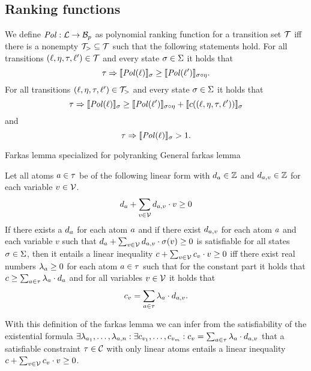 \subsection{Ranking functions}

\begin{definition} 
	We define $\mathit{Pol}: \mathcal{L} \rightarrow \mathcal{B}_p$ as polynomial ranking function for a transition set $\mathcal{T}$ iff there is a nonempty $\mathcal{T}_{>} \subseteq \mathcal{T}$ such that the following statements hold.
        For all transitions $(\ell, \eta, \tau, \ell') \in \mathcal{T}$ and every state $\sigma \in \Sigma$ it holds that
	\[ \tau \Rightarrow \llbracket \mathit{Pol}(\ell) \rrbracket_{\sigma} \geq \llbracket \mathit{Pol}(\ell') \rrbracket_{\sigma \circ \eta}. \]
        For all transitions $(\ell, \eta, \tau, \ell') \in \mathcal{T}_{>}$ and every state $\sigma \in \Sigma$ it holds that        
	\[ \tau \Rightarrow \llbracket \mathit{Pol}(\ell) \rrbracket_{\sigma} \geq \llbracket \mathit{Pol}(\ell') \rrbracket_{\sigma \circ \eta} + \llbracket c((\ell, \eta, \tau, \ell')) \rrbracket_{\sigma} \]
        and
	\[ \tau \Rightarrow \llbracket \mathit{Pol}(\ell) \rrbracket_{\sigma} > 1. \]
\end{definition}





Farkas lemma specialized for polyranking \cite{bradley2005polyranking}
General farkas lemma \cite{schrijver1998theory}
\begin{definition}
  Let all atoms $a \in \tau$ be of the following linear form with $d_a \in \mathbb{Z}$ and $d_{a,v} \in \mathbb{Z}$ for each variable $v \in \mathcal{V}$.
  \[ d_a + \sum_{v \in \mathcal{V}} d_{a,v} \cdot v \geq 0 \]
  If there exists a $d_a$ for each atom $a$ and if there exist $d_{a,v}$ for each atom $a$ and each variable $v$ such that $d_a + \sum_{v \in \mathcal{V}} d_{a,v} \cdot \sigma(v) \geq 0$ is satisfiable for all states $\sigma \in \Sigma$, then it entails a linear inequality $c + \sum_{v \in \mathcal{V}} c_v \cdot v \geq 0$ iff there exist real numbers $\lambda_a \geq 0$ for each atom $a \in \tau$ such that for the constant part it holds that $c \geq \sum_{a \in \tau} \lambda_a \cdot d_a$ and for all variables $v \in \mathcal{V}$ it holds that
  \[ c_v = \sum_{a \in \tau} \lambda_a \cdot d_{a,v}. \]
\end{definition}
With this definition of the farkas lemma we can infer from the satisfiability of the existential formula $\exists \lambda_{a_1}, \dots, \lambda_{a,n}: \exists c_{v_1}, \dots, c_{v_m}: c_v = \sum_{a \in \tau} \lambda_a \cdot d_{a,v}$ that a satisfiable constraint $\tau \in \mathcal{C}$ with only linear atoms entails a linear inequality $c + \sum_{v \in \mathcal{V}} c_v \cdot v \geq 0$.
